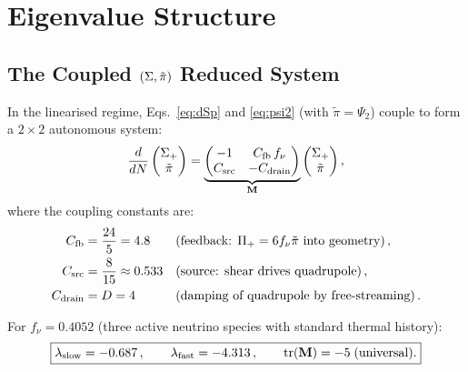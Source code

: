 \section{Eigenvalue Structure}\label{sec:eigenvalues}

\subsection{\texorpdfstring{The Coupled $(\Sigma, \tilde\pi)$ Reduced System}{The Coupled (Sigma, pi-tilde) Reduced System}}

In the linearised regime, Eqs.~\eqref{eq:dSp} and \eqref{eq:psi2} (with $\tilde\pi = \Psi_2$) couple to form a $2 \times 2$ autonomous system:
\begin{equation}
\frac{d}{dN}\begin{pmatrix} \Sigma_+ \\ \tilde\pi \end{pmatrix} = \underbrace{\begin{pmatrix} -1 & C_{\rm fb}\,f_\nu \\ C_{\rm src} & -C_{\rm drain} \end{pmatrix}}_{\mathbf{M}} \begin{pmatrix} \Sigma_+ \\ \tilde\pi \end{pmatrix},\label{eq:matrix}
\end{equation}
where the coupling constants are:
\begin{align}
C_{\rm fb} &= \frac{24}{5} = 4.8 && \text{(feedback: } \Pi_+ = 6f_\nu\tilde\pi \text{ into geometry)}\,,\\
C_{\rm src} &= \frac{8}{15} \approx 0.533 && \text{(source: shear drives quadrupole)}\,,\\
C_{\rm drain} &= D = 4 && \text{(damping of quadrupole by free-streaming)}\,.
\end{align}

\begin{proposition}\label{prop:eigenvalues}
For $f_\nu = 0.4052$ (three active neutrino species with standard thermal history):
\begin{equation}
\boxed{\lambda_{\rm slow} = -0.687\,,\qquad \lambda_{\rm fast} = -4.313\,,\qquad \mathrm{tr}(\mathbf{M}) = -5\;\text{(universal).}}
\end{equation}
\end{proposition}


